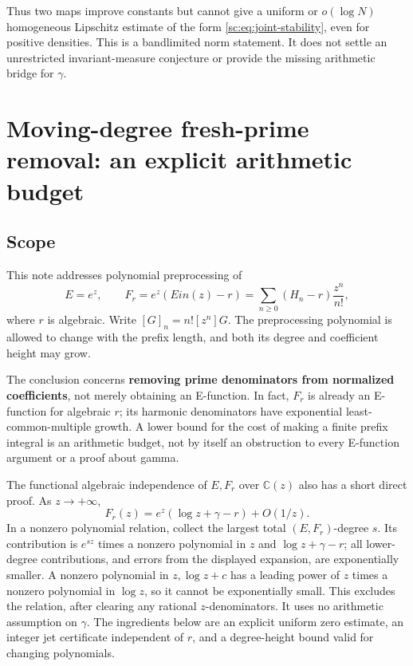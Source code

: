 \documentclass[11pt,a4paper]{article}
\theoremstyle{definition}
\theoremstyle{remark}
\theoremstyle{plain}
\numberwithin{equation}{section}
\def\operatorname#1{#1}\def\mathrm#1{#1}}
\begin{document}
Thus two maps improve constants but cannot give a uniform or
$o(\log N)$ homogeneous Lipschitz estimate of the form
\eqref{sc:eq:joint-stability}, even for positive densities.
This is a bandlimited norm statement. It does not settle an
unrestricted invariant-measure conjecture or provide the missing
arithmetic bridge for $\gamma$.




\section{Moving-degree fresh-prime removal: an explicit arithmetic
budget}\label{sc:md:moving-degree-fresh-prime-removal-an-explicit-arithmetic-budget}

\subsection{Scope}\label{sc:md:scope}

This note addresses polynomial preprocessing of \[
E=e^z,\qquad F_r=e^z(\operatorname{Ein}(z)-r)
=\sum_{n\ge0}(H_n-r)\frac{z^n}{n!},
\] where \(r\) is algebraic. Write \([G]_n=n![z^n]G\). The preprocessing
polynomial is allowed to change with the prefix length, and both its
degree and coefficient height may grow.

The conclusion concerns \textbf{removing prime denominators from
normalized coefficients}, not merely obtaining an E-function. In fact,
\(F_r\) is already an E-function for algebraic \(r\); its harmonic
denominators have exponential least-common-multiple growth. A lower
bound for the cost of making a finite prefix integral is an arithmetic
budget, not by itself an obstruction to every E-function argument or a
proof about gamma.

The functional algebraic independence of \(E,F_r\) over \(\mathbb C(z)\)
also has a short direct proof. As \(z\to+\infty\), \[
F_r(z)=e^z(\log z+\gamma-r)+O(1/z).
\] In a nonzero polynomial relation, collect the largest total
\((E,F_r)\)-degree \(s\). Its contribution is \(e^{sz}\) times a nonzero
polynomial in \(z\) and \(\log z+\gamma-r\); all lower-degree
contributions, and errors from the displayed expansion, are
exponentially smaller. A nonzero polynomial in \(z,\log z+c\) has a
leading power of \(z\) times a nonzero polynomial in \(\log z\), so it
cannot be exponentially small. This excludes the relation, after
clearing any rational \(z\)-denominators. It uses no arithmetic
assumption on \(\gamma\). The ingredients below are an explicit uniform
zero estimate, an integer jet certificate independent of \(r\), and a
degree-height bound valid for changing polynomials.
\end{document}

